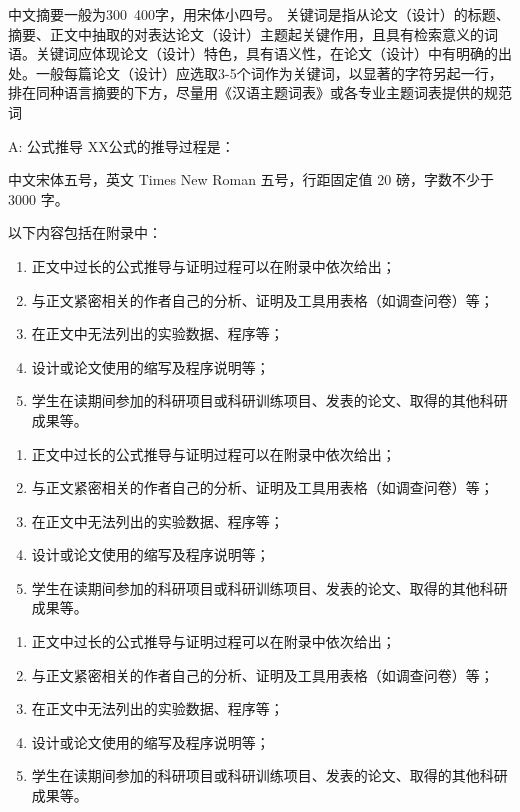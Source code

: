 \documentclass{document}
\begin{document}
中文摘要一般为300~400字，用宋体小四号。 
关键词是指从论文（设计）的标题、摘要、正文中抽取的对表达论文（设计）主题起关键作用，且具有检索意义的词语。关键词应体现论文（设计）特色，具有语义性，在论文（设计）中有明确的出处。一般每篇论文（设计）应选取3-5个词作为关键词，以显著的字符另起一行，排在同种语言摘要的下方，尽量用《汉语主题词表》或各专业主题词表提供的规范词


\clearpage

\bibcustom

\begin{cquappendix}{A: 公式推导}
    XX公式的推导过程是：
    
    中文宋体五号，英文 Times New Roman 五号，行距固定值 20 磅，字数不少于 3000 字。
    
    以下内容包括在附录中：
    \begin{enumerate}
        \item 正文中过长的公式推导与证明过程可以在附录中依次给出；
        \item 与正文紧密相关的作者自己的分析、证明及工具用表格（如调查问卷）等；
        \item 在正文中无法列出的实验数据、程序等；
        \item 设计或论文使用的缩写及程序说明等；
        \item 学生在读期间参加的科研项目或科研训练项目、发表的论文、取得的其他科研成果等。
    \end{enumerate}

    \begin{enumerate}
        \item 正文中过长的公式推导与证明过程可以在附录中依次给出；
        \item 与正文紧密相关的作者自己的分析、证明及工具用表格（如调查问卷）等；
        \item 在正文中无法列出的实验数据、程序等；
        \item 设计或论文使用的缩写及程序说明等；
        \item 学生在读期间参加的科研项目或科研训练项目、发表的论文、取得的其他科研成果等。
    \end{enumerate}

    \begin{enumerate}
        \item 正文中过长的公式推导与证明过程可以在附录中依次给出；
        \item 与正文紧密相关的作者自己的分析、证明及工具用表格（如调查问卷）等；
        \item 在正文中无法列出的实验数据、程序等；
        \item 设计或论文使用的缩写及程序说明等；
        \item 学生在读期间参加的科研项目或科研训练项目、发表的论文、取得的其他科研成果等。
    \end{enumerate}


\end{cquappendix}
\end{document}
